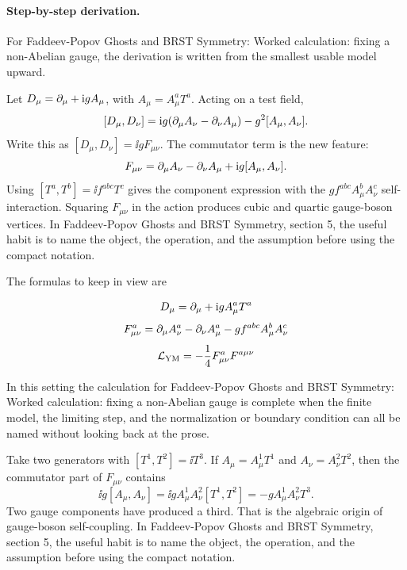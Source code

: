 \paragraph{Step-by-step derivation.}

For Faddeev-Popov Ghosts and BRST Symmetry: Worked calculation: fixing a non-Abelian gauge, the derivation is written from the smallest usable model upward.

Let \(D_\mu=\partial_\mu+\mathrm i gA_\mu\), with \(A_\mu=A_\mu^aT^a\).  Acting on a test field,
\[
  [D_\mu,D_\nu]
  =
  \mathrm i g(\partial_\mu A_\nu-\partial_\nu A_\mu)-g^2[A_\mu,A_\nu].
\]
Write this as \([D_\mu,D_\nu]=\ii gF_{\mu\nu}\).  The commutator term is the new feature:
\[
  F_{\mu\nu}=\partial_\mu A_\nu-\partial_\nu A_\mu+\mathrm i g[A_\mu,A_\nu].
\]
Using \([T^a,T^b]=\ii f^{abc}T^c\) gives the component expression with the \(gf^{abc}A_\mu^bA_\nu^c\) self-interaction.  Squaring \(F_{\mu\nu}\) in the action produces cubic and quartic gauge-boson vertices.  In Faddeev-Popov Ghosts and BRST Symmetry, section 5, the useful habit is to name the object, the operation, and the assumption before using the compact notation.

The formulas to keep in view are

\[
  D_\mu=\partial_\mu+\mathrm i gA_\mu^aT^a
\]
\[
  F_{\mu\nu}^a=\partial_\mu A_\nu^a-\partial_\nu A_\mu^a-gf^{abc}A_\mu^bA_\nu^c
\]
\[
  \mathcal L_{\mathrm{YM}}=-\frac14F_{\mu\nu}^aF^{a\mu\nu}
\]

In this setting the calculation for Faddeev-Popov Ghosts and BRST Symmetry: Worked calculation: fixing a non-Abelian gauge is complete when the finite model, the limiting step, and the normalization or boundary condition can all be named without looking back at the prose.




\begin{example}
Take two generators with \([T^1,T^2]=\ii T^3\).  If \(A_\mu=A_\mu^1T^1\) and \(A_\nu=A_\nu^2T^2\), then the commutator part of \(F_{\mu\nu}\) contains
\[
  \ii g[A_\mu,A_\nu]=\ii gA_\mu^1A_\nu^2[T^1,T^2]=-gA_\mu^1A_\nu^2T^3.
\]
Two gauge components have produced a third.  That is the algebraic origin of gauge-boson self-coupling.  In Faddeev-Popov Ghosts and BRST Symmetry, section 5, the useful habit is to name the object, the operation, and the assumption before using the compact notation.
\end{example}



